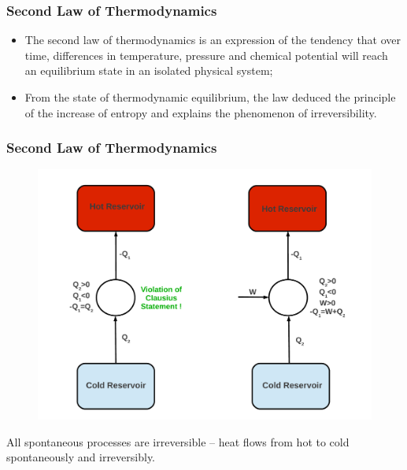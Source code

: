 \documentclass[10pt,compress]{beamer}
\begin{document}
\begin{frame}
 \frametitle{Second Law of Thermodynamics}
 \begin{itemize}
   \item <2->The second law of thermodynamics is an expression of the tendency that over time, differences in temperature, pressure and chemical potential will reach an equilibrium state in an isolated physical system;
   \item <3->From the state of thermodynamic equilibrium, the law deduced the principle of the increase of entropy and explains the phenomenon of irreversibility.
 \end{itemize}



 \normalsize
\end{frame}


\begin{frame}
 \frametitle{Second Law of Thermodynamics}
 
   \begin{figure}%
    \begin{center}
     \includegraphics[width=8.cm,clip]{./Pics/2ndLaw_Schem}
    \end{center}
   \end{figure} 

   \begin{center}
     All spontaneous processes are irreversible -- heat flows from hot to cold spontaneously and irreversibly.
   \end{center}
   
\end{frame}
\end{document}
